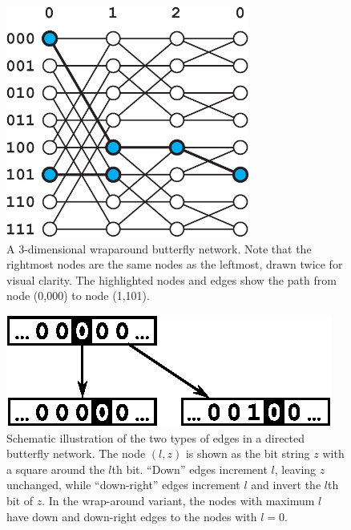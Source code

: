\documentclass[10pt,letterpaper]{article}
\begin{document}
\begin{figure}[!h]
\begin{center}
\includegraphics[height=3in]{fig-bf-route}
\end{center}
\caption{
A 3-dimensional wraparound butterfly network.
Note that the rightmost nodes are the same nodes as the leftmost,
drawn twice for visual clarity.
The highlighted nodes and edges show the path from node (0,000)
to node (1,101).
\label{fig:bf-route}
}
\end{figure}

\begin{figure}[!h]
\begin{center}
\includegraphics{fig-butterfly}
\end{center}
\caption{
Schematic illustration of the two types of edges in a directed butterfly
network.
The node $(l,z)$ is shown as the bit string $z$ with a square around the
$l$th bit.
``Down'' edges increment $l$, leaving $z$ unchanged,
while ``down-right'' edges increment $l$ and invert the $l$th bit of $z$.
In the wrap-around variant, the nodes with maximum $l$ have down and down-right
edges to the nodes with $l=0$.
\label{fig:butterfly}
}
\end{figure}
\end{document}
